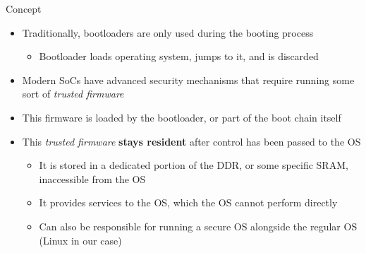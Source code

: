 \begin{frame}{Concept}
  \begin{itemize}
  \item Traditionally, bootloaders are only used during the booting
    process
    \begin{itemize}
    \item Bootloader loads operating system, jumps to it, and is
      discarded
    \end{itemize}
  \item Modern SoCs have advanced security mechanisms that require
    running some sort of {\em trusted firmware}
  \item This firmware is loaded by the bootloader, or part of the boot
    chain itself
  \item This {\em trusted firmware} {\bf stays resident} after control
    has been passed to the OS
    \begin{itemize}
    \item It is stored in a dedicated portion of the DDR, or some
      specific SRAM, inaccessible from the OS
    \item It provides services to the OS, which the OS cannot perform
      directly
    \item Can also be responsible for running a secure OS alongside the
      regular OS (Linux in our case)
    \end{itemize}
  \end{itemize}
\end{frame}

